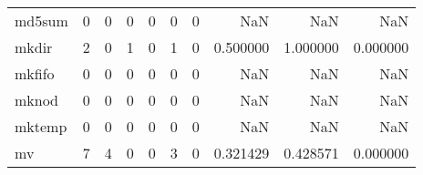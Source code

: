 \begin{longtable}{lrrrrrrrrr}
md5sum    &                                                  0 &                                                  0 &                                                  0 &                                                  0 &                                                  0 &                                                  0 &                                                NaN &                                    NaN &                                  NaN \\
mkdir     &                                                  2 &                                                  0 &                                                  1 &                                                  0 &                                                  1 &                                                  0 &                                           0.500000 &                               1.000000 &                             0.000000 \\
mkfifo    &                                                  0 &                                                  0 &                                                  0 &                                                  0 &                                                  0 &                                                  0 &                                                NaN &                                    NaN &                                  NaN \\
mknod     &                                                  0 &                                                  0 &                                                  0 &                                                  0 &                                                  0 &                                                  0 &                                                NaN &                                    NaN &                                  NaN \\
mktemp    &                                                  0 &                                                  0 &                                                  0 &                                                  0 &                                                  0 &                                                  0 &                                                NaN &                                    NaN &                                  NaN \\
mv        &                                                  7 &                                                  4 &                                                  0 &                                                  0 &                                                  3 &                                                  0 &                                           0.321429 &                               0.428571 &                             0.000000 \\

\end{longtable}
